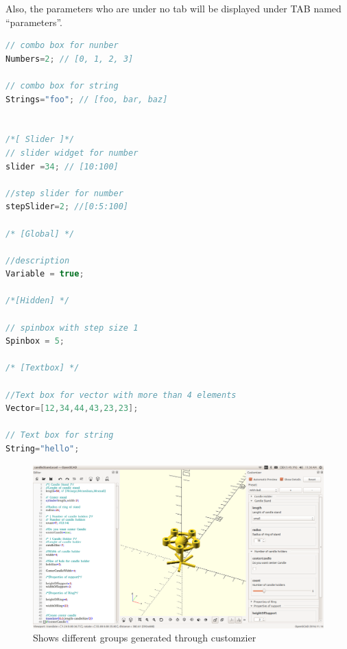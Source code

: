 \documentclass[12pt]{report}
\begin{document}
Also, the parameters who are under no tab will be displayed under TAB named “parameters”.
\begin{lstlisting}[language=c++]
// combo box for nunber
Numbers=2; // [0, 1, 2, 3]

// combo box for string
Strings="foo"; // [foo, bar, baz]


/*[ Slider ]*/
// slider widget for number
slider =34; // [10:100]

//step slider for number
stepSlider=2; //[0:5:100]

/* [Global] */

//description
Variable = true;

/*[Hidden] */

// spinbox with step size 1
Spinbox = 5;

/* [Textbox] */

//Text box for vector with more than 4 elements
Vector=[12,34,44,43,23,23];

// Text box for string
String="hello";

\end{lstlisting}

\begin{figure}
	\centering \includegraphics[width=\linewidth]{images/output/6.png}
	\caption{Shows different groups generated through customzier}
	\label{fig:5}
\end{figure}


\end{document}
